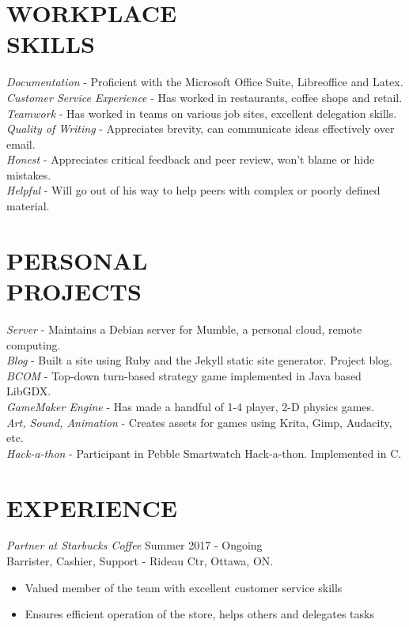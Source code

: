 \documentclass[margin]{res}
\begin{document}
\begin{resume}
\section{WORKPLACE \\ SKILLS} 
 {\sl Documentation} - Proficient with the Microsoft Office Suite, Libreoffice and Latex.\\
{\sl Customer Service Experience} - Has worked in restaurants, coffee shops and retail.\\
{\sl Teamwork} - Has worked in teams on various job sites, excellent delegation skills.\\
{\sl Quality of Writing} - Appreciates brevity, can communicate ideas effectively over email.\\
{\sl Honest} - Appreciates critical feedback and peer review, won't blame or hide mistakes.\\
{\sl Helpful} - Will go out of his way to help peers with complex or poorly defined material.



\section{PERSONAL \\ PROJECTS}     
	{\sl Server} - Maintains a Debian server for Mumble, a personal cloud, remote computing.\\   
	{\sl Blog} - Built a site using Ruby and the Jekyll static site generator. Project blog.\\   
	{\sl BCOM} - Top-down turn-based strategy game implemented in Java based LibGDX.\\
	{\sl GameMaker Engine} - Has made a handful of 1-4 player, 2-D physics games.\\
	{\sl Art, Sound, Animation} - Creates assets for games using Krita, Gimp, Audacity, etc.\\
	{\sl Hack-a-thon} - Participant in Pebble Smartwatch Hack-a-thon. Implemented in C.
 




\section{EXPERIENCE} {\sl Partner at Starbucks Coffee} \hfill Summer 2017 - Ongoing \\
                Barrister, Cashier, Support - Rideau Ctr, Ottawa, ON.
                 \begin{itemize}  \itemsep -2pt %
                 \item Valued member of the team with excellent customer service skills
                \item  Ensures efficient operation of the store, helps others and delegates tasks
                \end{itemize}
 

\end{resume}
\end{document}
